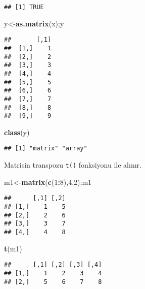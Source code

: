 \documentclass[
]{book}
\newenvironment{Shaded}{\begin{snugshade}}{\end{snugshade}}
\newcommand{\DecValTok}[1]{\textcolor[rgb]{0.00,0.00,0.81}{#1}}
\newcommand{\KeywordTok}[1]{\textcolor[rgb]{0.13,0.29,0.53}{\textbf{#1}}}
\newcommand{\NormalTok}[1]{#1}
\newcommand{\OperatorTok}[1]{\textcolor[rgb]{0.81,0.36,0.00}{\textbf{#1}}}
\begin{document}
\begin{verbatim}
## [1] TRUE
\end{verbatim}

\begin{Shaded}
\begin{Highlighting}[]
\NormalTok{y<-}\KeywordTok{as.matrix}\NormalTok{(x);y}
\end{Highlighting}
\end{Shaded}

\begin{verbatim}
##       [,1]
##  [1,]    1
##  [2,]    2
##  [3,]    3
##  [4,]    4
##  [5,]    5
##  [6,]    6
##  [7,]    7
##  [8,]    8
##  [9,]    9
\end{verbatim}

\begin{Shaded}
\begin{Highlighting}[]
\KeywordTok{class}\NormalTok{(y)}
\end{Highlighting}
\end{Shaded}

\begin{verbatim}
## [1] "matrix" "array"
\end{verbatim}

Matrisin transpozu \texttt{t()} fonksiyonu ile alınır.

\begin{Shaded}
\begin{Highlighting}[]
\NormalTok{m1<-}\KeywordTok{matrix}\NormalTok{(}\KeywordTok{c}\NormalTok{(}\DecValTok{1}\OperatorTok{:}\DecValTok{8}\NormalTok{),}\DecValTok{4}\NormalTok{,}\DecValTok{2}\NormalTok{);m1}
\end{Highlighting}
\end{Shaded}

\begin{verbatim}
##      [,1] [,2]
## [1,]    1    5
## [2,]    2    6
## [3,]    3    7
## [4,]    4    8
\end{verbatim}

\begin{Shaded}
\begin{Highlighting}[]
\KeywordTok{t}\NormalTok{(m1) }
\end{Highlighting}
\end{Shaded}

\begin{verbatim}
##      [,1] [,2] [,3] [,4]
## [1,]    1    2    3    4
## [2,]    5    6    7    8
\end{verbatim}
\end{document}
